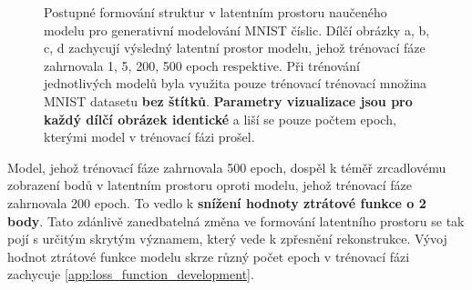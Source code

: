 \begin{figure}[H]
    \caption{Postupné formování struktur v latentním prostoru naučeného modelu pro generativní modelování MNIST číslic.
    Dílčí obrázky a, b, c, d zachycují výsledný latentní prostor modelu, jehož trénovací fáze zahrnovala 1, 5, 200, 500 epoch respektive.
    Při trénování jednotlivých modelů byla využita pouze trénovací trénovací množina MNIST datasetu \textbf{bez štítků}.
    \textbf{Parametry vizualizace jsou pro každý dílčí obrázek identické} a liší se pouze počtem epoch, kterými model v trénovací fázi prošel.
    }
    \label{fig:forming_latent_space}
\end{figure}

Model, jehož trénovací fáze zahrnovala 500 epoch, dospěl k téměř zrcadlovému zobrazení bodů v latentním prostoru oproti modelu, jehož trénovací fáze zahrnovala 200 epoch.
To vedlo k \textbf{snížení hodnoty ztrátové funkce o 2 body}. Tato zdánlivě zanedbatelná změna ve formování latentního prostoru se tak pojí s určitým skrytým významem, který vede k zpřesnění rekonstrukce.
Vývoj hodnot ztrátové funkce modelu skrze různý počet epoch v trénovací fázi zachycuje \autoref{app:loss_function_development}. 